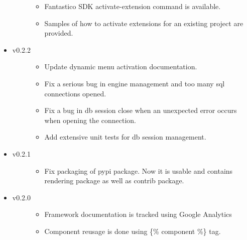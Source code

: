 \documentclass[letterpaper,10pt,english]{sphinxmanual}
\begin{document}
\begin{itemize}
\begin{description}
\begin{itemize}
\item {} 
Fantastico SDK activate-extension command is available.

\item {} 
Samples of how to activate extensions for an existing project are provided.

\end{itemize}

\end{description}

\item {} \begin{description}
\item[{v0.2.2}] \leavevmode\begin{itemize}
\item {} 
Update dynamic menu activation documentation.

\item {} 
Fix a serious bug in engine management and too many sql connections opened.

\item {} 
Fix a bug in db session close when an unexpected error occurs when opening the connection.

\item {} 
Add extensive unit tests for db session management.

\end{itemize}

\end{description}

\item {} \begin{description}
\item[{v0.2.1}] \leavevmode\begin{itemize}
\item {} 
Fix packaging of pypi package. Now it is usable and contains rendering package as well as contrib package.

\end{itemize}

\end{description}

\item {} \begin{description}
\item[{v0.2.0}] \leavevmode\begin{itemize}
\item {} 
Framework documentation is tracked using Google Analytics

\item {} 
Component reusage is done using \{\% component \%\} tag.


\end{itemize}
\end{description}
\end{itemize}
\end{document}
